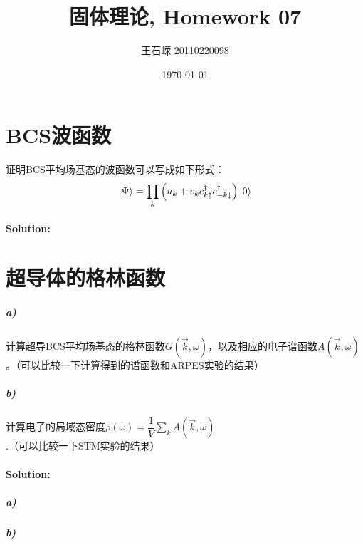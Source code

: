 \documentclass[a4paper]{article}
\title{固体理论, Homework 07}
\author{王石嵘 20110220098}
\date{\today} %
\numberwithin{equation}{section}
\begin{document}
\maketitle




\section{BCS波函数}
证明BCS平均场基态的波函数可以写成如下形式：
$$ \ket{\Psi}=\prod_k\left(u_k+v_kc_{k\uparrow}^\dagger c_{-k\downarrow}^\dagger\right)\ket{0} $$
\paragraph{Solution:}

\section{超导体的格林函数}
\subparagraph{a)} 计算超导BCS平均场基态的格林函数$ G(\vec k,\omega) $，以及相应的电子谱函数$ A(\vec k,\omega) $。（可以比较一下计算得到的谱函数和ARPES实验的结果）
\subparagraph{b)} 计算电子的局域态密度$ \rho(\omega)=\dfrac{1}{V}\sum_k A(\vec k,\omega) $.（可以比较一下STM实验的结果）
\paragraph{Solution:}
\subparagraph{a)} 
\subparagraph{b)}
\end{document}
